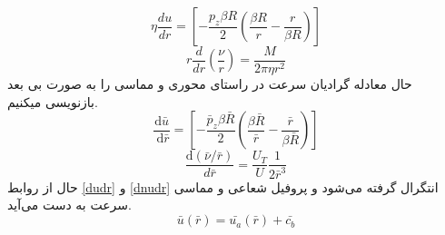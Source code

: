 \begin{equation}
	\label{19}
		\eta \frac{du}{dr} = \left[-\frac{p_{z} \beta R}{2}\left(\frac{\beta R}{r}-\frac{r}{\beta R}\right)\right]
\end{equation}
\begin{equation}
	\label{20}
	r\frac{d}{dr}\left(\frac{\nu}{r}\right) = \frac{M}{2\pi\eta r^2}
\end{equation}
حال معادله گرادیان سرعت در راستای محوری و مماسی را به صورت بی بعد بازنویسی میکنیم.
\begin{equation}
	\label{dudr}
	\frac{\mathrm{d} \bar{u}}{\mathrm{~d} \bar{r}}=\left[-\frac{\bar{p}_{z} \beta \bar{R}}{2}\left(\frac{\beta \bar{R}}{\bar{r}}-\frac{\bar{r}}{\beta \bar{R}}\right)\right]
\end{equation}
\begin{equation}
	\label{dnudr}
	\frac{\mathrm{d}(\bar{\nu} / \bar{r})}{d \bar{r}}=\frac{U_{T}}{U} \frac{1}{2 \bar{r}^{3}}
\end{equation}
حال از روابط 
\ref{dudr}
و 
\ref{dnudr}
انتگرال گرفته می‌شود و پروفیل شعاعی و مماسی سرعت به دست می‌آید.
\begin{equation}
	\label{uC}
	\bar{u}(\bar{r}) = \bar{u_a}(\bar{r}) + \bar{c_b}
\end{equation}
